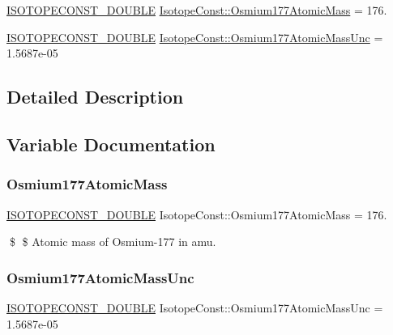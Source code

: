 \begin{DoxyCompactItemize}
\item 
\mbox{\hyperlink{group___isotope_const-_macros_ga8f45a7272ce02c0b4c65c44636ed719a}{I\+S\+O\+T\+O\+P\+E\+C\+O\+N\+S\+T\+\_\+\+D\+O\+U\+B\+LE}} \mbox{\hyperlink{group___isotope_const-_osmium-_os177_gadefb2c95f223d8cb52fc558a3a147f6a}{Isotope\+Const\+::\+Osmium177\+Atomic\+Mass}} = 176.
\item 
\mbox{\hyperlink{group___isotope_const-_macros_ga8f45a7272ce02c0b4c65c44636ed719a}{I\+S\+O\+T\+O\+P\+E\+C\+O\+N\+S\+T\+\_\+\+D\+O\+U\+B\+LE}} \mbox{\hyperlink{group___isotope_const-_osmium-_os177_ga9c8cb418b2e9a7d8165d82965bcd6ead}{Isotope\+Const\+::\+Osmium177\+Atomic\+Mass\+Unc}} = 1.\+5687e-\/05
\end{DoxyCompactItemize}


\subsection{Detailed Description}


\subsection{Variable Documentation}
\mbox{\label{group___isotope_const-_osmium-_os177_gadefb2c95f223d8cb52fc558a3a147f6a}} 
\subsubsection{\texorpdfstring{Osmium177\+Atomic\+Mass}{Osmium177AtomicMass}}
{\footnotesize\ttfamily \mbox{\hyperlink{group___isotope_const-_macros_ga8f45a7272ce02c0b4c65c44636ed719a}{I\+S\+O\+T\+O\+P\+E\+C\+O\+N\+S\+T\+\_\+\+D\+O\+U\+B\+LE}} Isotope\+Const\+::\+Osmium177\+Atomic\+Mass = 176.}

\$ \$ Atomic mass of Osmium-\/177 in amu. \mbox{\label{group___isotope_const-_osmium-_os177_ga9c8cb418b2e9a7d8165d82965bcd6ead}} 
\subsubsection{\texorpdfstring{Osmium177\+Atomic\+Mass\+Unc}{Osmium177AtomicMassUnc}}
{\footnotesize\ttfamily \mbox{\hyperlink{group___isotope_const-_macros_ga8f45a7272ce02c0b4c65c44636ed719a}{I\+S\+O\+T\+O\+P\+E\+C\+O\+N\+S\+T\+\_\+\+D\+O\+U\+B\+LE}} Isotope\+Const\+::\+Osmium177\+Atomic\+Mass\+Unc = 1.\+5687e-\/05}


